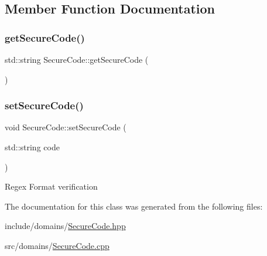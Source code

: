 \subsection{Member Function Documentation}
\mbox{\label{class_secure_code_a5ead36d45429c9c84d3b9d03b7aef63b}} 
\subsubsection{\texorpdfstring{getSecureCode()}{getSecureCode()}}
{\footnotesize\ttfamily std\+::string Secure\+Code\+::get\+Secure\+Code (\begin{DoxyParamCaption}{ }\end{DoxyParamCaption})}

\mbox{\label{class_secure_code_a7417a7fff51641cd8e5f829af6af7eea}} 
\subsubsection{\texorpdfstring{setSecureCode()}{setSecureCode()}}
{\footnotesize\ttfamily void Secure\+Code\+::set\+Secure\+Code (\begin{DoxyParamCaption}\item[{std\+::string}]{code }\end{DoxyParamCaption})}

Regex Format verification 

The documentation for this class was generated from the following files\+:\begin{DoxyCompactItemize}
\item 
include/domains/\mbox{\hyperlink{_secure_code_8hpp}{Secure\+Code.\+hpp}}\item 
src/domains/\mbox{\hyperlink{_secure_code_8cpp}{Secure\+Code.\+cpp}}\end{DoxyCompactItemize}
